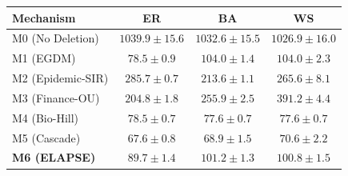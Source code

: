 \begin{tabular}{lccc}
  \toprule
  Mechanism & ER & BA & WS \\
  \midrule
  M0 (No Deletion) & $1039.9 \pm 15.6$ & $1032.6 \pm 15.5$ & $1026.9 \pm 16.0$ \\
  M1 (EGDM) & $78.5 \pm 0.9$ & $104.0 \pm 1.4$ & $104.0 \pm 2.3$ \\
  M2 (Epidemic-SIR) & $285.7 \pm 0.7$ & $213.6 \pm 1.1$ & $265.6 \pm 8.1$ \\
  M3 (Finance-OU) & $204.8 \pm 1.8$ & $255.9 \pm 2.5$ & $391.2 \pm 4.4$ \\
  M4 (Bio-Hill) & $78.5 \pm 0.7$ & $77.6 \pm 0.7$ & $77.6 \pm 0.7$ \\
  M5 (Cascade) & $67.6 \pm 0.8$ & $68.9 \pm 1.5$ & $70.6 \pm 2.2$ \\
  \midrule
  \textbf{M6 (ELAPSE)} & \textbf{$89.7 \pm 1.4$} & \textbf{$101.2 \pm 1.3$} & \textbf{$100.8 \pm 1.5$} \\
  \bottomrule
\end{tabular}